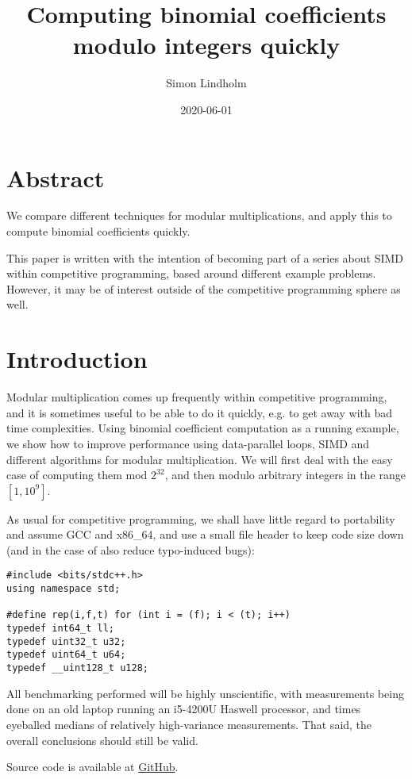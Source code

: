 \documentclass{article}
\title{Computing binomial coefficients modulo integers quickly}
\author{Simon Lindholm}
\date{2020-06-01}
\begin{document}
\maketitle

\section*{Abstract}
We compare different techniques for modular multiplications, and apply this to compute binomial coefficients quickly.

This paper is written with the intention of becoming part of a series about SIMD within competitive programming, based around different example problems.
However, it may be of interest outside of the competitive programming sphere as well.

\tableofcontents

\section{Introduction}

Modular multiplication comes up frequently within competitive programming,
and it is sometimes useful to be able to do it quickly, e.g. to get away
with bad time complexities.
Using binomial coefficient computation as a running example, we show how
to improve performance using data-parallel loops, SIMD and different
algorithms for modular multiplication.
We will first deal with the easy case of computing them mod $2^{32}$, and
then modulo arbitrary integers in the range $[1, 10^9]$.

As usual for competitive programming, we shall have
little regard to portability and assume GCC and x86\_64,
and use a small file header to keep code size down (and
in the case of \verb@rep@ also reduce typo-induced bugs):

\begin{lstlisting}
#include <bits/stdc++.h>
using namespace std;

#define rep(i,f,t) for (int i = (f); i < (t); i++)
typedef int64_t ll;
typedef uint32_t u32;
typedef uint64_t u64;
typedef __uint128_t u128;
\end{lstlisting}

All benchmarking performed will be highly unscientific,
with measurements being done on an old laptop running an i5-4200U Haswell processor,
and times eyeballed medians of relatively high-variance measurements.
That said, the overall conclusions should still be valid.

Source code is available at \href{https://github.com/simonlindholm/simd-book/tree/master/binomial-coefficients}{GitHub}.




\end{document}
